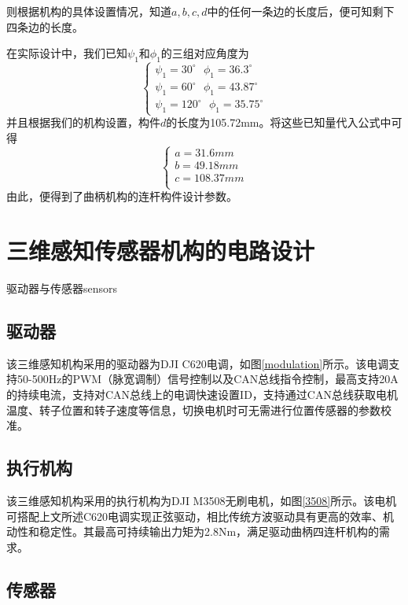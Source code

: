 则根据机构的具体设置情况，知道$a,b,c,d$中的任何一条边的长度后，便可知剩下四条边的长度。

在实际设计中，我们已知$\psi_1$和$\phi_1$的三组对应角度为
$$ 
\begin{cases}
\psi_1=30^\circ \ \ \ \phi_1=36.3^\circ\\
\psi_1=60^\circ \ \ \ \phi_1=43.87^\circ\\
\psi_1=120^\circ \ \ \  \phi_1=35.75^\circ
\end{cases}
$$
并且根据我们的机构设置，构件$d$的长度为105.72mm。将这些已知量代入公式中可得
$$ 
\begin{cases}
a=31.6mm \\
b=49.18mm \\
c=108.37mm \\
\end{cases}
$$
由此，便得到了曲柄机构的连杆构件设计参数。

\section{三维感知传感器机构的电路设计}

\begin{pics}[htbp]{驱动器与传感器}{sensors}
\end{pics}

\subsection{驱动器}
该三维感知机构采用的驱动器为DJI C620电调，如图\ref{modulation}所示。该电调支持50-500Hz的PWM（脉宽调制）信号控制以及CAN总线指令控制，最高支持20A的持续电流，支持对CAN总线上的电调快速设置ID，支持通过CAN总线获取电机温度、转子位置和转子速度等信息，切换电机时可无需进行位置传感器的参数校准。

\subsection{执行机构}
该三维感知机构采用的执行机构为DJI M3508无刷电机，如图\ref{3508}所示。该电机可搭配上文所述C620电调实现正弦驱动，相比传统方波驱动具有更高的效率、机动性和稳定性。其最高可持续输出力矩为2.8Nm，满足驱动曲柄四连杆机构的需求。
\subsection{传感器}

